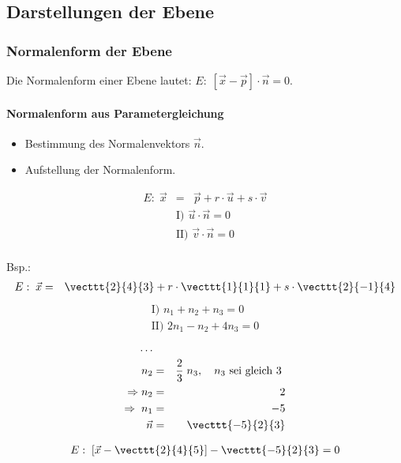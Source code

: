 \documentclass[a4paper]{article}
\begin{document}
\subsection{Darstellungen der Ebene}
\subsubsection{Normalenform der Ebene}
Die Normalenform einer Ebene lautet: $E: \; \left[ \vec{x} - \vec{p} \right] \cdot \vec{n} = 0$.
\paragraph{Normalenform aus Parametergleichung}
\begin{itemize}
\item Bestimmung des Normalenvektors $\vec{n}$.
\item Aufstellung der Normalenform.
\end{itemize}
\begin{eqnarray*}
E:\; \vec{x} &=& \vec{p} + r\cdot\vec{u} + s\cdot\vec{v}
\end{eqnarray*}
\begin{eqnarray*}
\text{I) }\vec{u} \cdot \vec{n} = 0\\
\text{II) }\vec{v} \cdot \vec{n} = 0\\
\end{eqnarray*}



Bsp.:
\begin{eqnarray*}
E:\; \vec{x} &=& \vecttt{2}{4}{3} + r\cdot\vecttt{1}{1}{1} + s\cdot\vecttt{2}{-1}{4}
\end{eqnarray*}
\begin{eqnarray*}
\text{I) } n_1 + n_2 +n_3 = 0\\
\text{II) } 2n_1 - n_2 + 4n_3 = 0
\end{eqnarray*}
\begin{eqnarray*}
\dots\\
n_2 &=& \frac{2}{3} \; n_3, \quad n_3 \text{ sei gleich 3 } \\
\Rightarrow n_2 &=& 2\\
\Rightarrow\; n_1 &=& -5\\
\vec{n} &=& \vecttt{-5}{2}{3}
\end{eqnarray*}

\begin{eqnarray*}
E:\; \left[ \vec{x} - \vecttt{2}{4}{5} \right]-\vecttt{-5}{2}{3} = 0
\end{eqnarray*}
\end{document}
